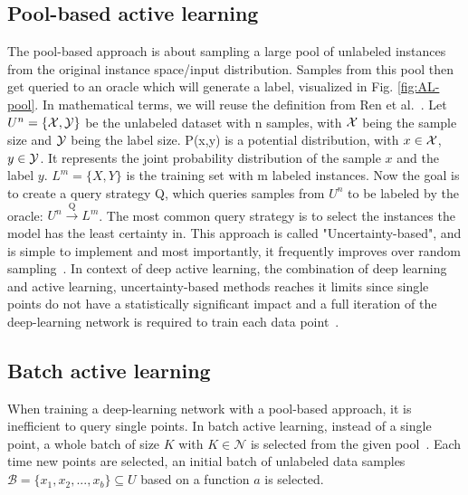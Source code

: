 \subsection{Pool-based active learning}
The pool-based approach is about sampling a large pool 
of unlabeled instances from the original instance 
space/input distribution. Samples from this pool then 
get queried to an oracle which will generate a label, 
visualized in Fig. \ref{fig:AL-pool}.
In mathematical terms, we will reuse the 
definition from Ren et al.~\cite{ren2021survey}. 
Let $U^n = \{\mathcal{X}, \mathcal{Y}\}$ be the unlabeled dataset with n samples,
with $\mathcal{X}$ being the sample size and $\mathcal{Y}$ being the label size.
P(x,y) is a potential distribution, with $x \in \mathcal{X}$, $y \in \mathcal{Y}$. 
It represents the joint probability distribution of the sample 
$x$ and the label $y$. $L^m=\{X,Y\}$ is the training set with m labeled instances. 
Now the goal is to create a query strategy Q, 
which queries samples from $U^n$ to be labeled 
by the oracle: $U^n \xrightarrow{\text{Q}} L^m$. 
The most common query strategy is 
to select the instances the model has the least certainty in.
This approach is called "Uncertainty-based",
and is simple to implement and most importantly, 
it frequently improves over random sampling~\cite{zhan2021comparative}. 
In context of deep active learning, the combination of deep learning 
and active learning, uncertainty-based methods reaches it limits 
since single points do not have a statistically significant 
impact and a full iteration of the deep-learning network is 
required to train each data point~\cite{sener2017active}. 

\subsection{Batch active learning}
When training a deep-learning network with a pool-based approach, 
it is inefficient to query single points. 
In batch active learning, instead of a single point, 
a whole batch of size $K$ with $K\in\mathcal{N}$  
is selected from the given pool~\cite{ren2021survey}. 
Each time new points are selected, an initial batch of 
unlabeled data samples 
$\mathcal{B} = \{x_1,x_2,...,x_b\}\subseteq U$ 
based on a function $a$ is selected. 
